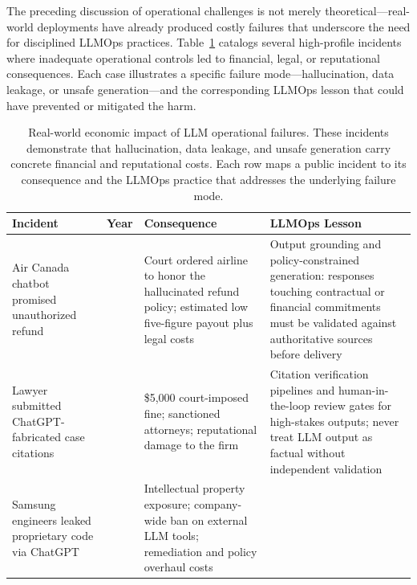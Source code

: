 The preceding discussion of operational challenges is not merely theoretical---real-world deployments have already produced costly failures that underscore the need for disciplined LLMOps practices. Table~\ref{tab:ch01_economic_impact} catalogs several high-profile incidents where inadequate operational controls led to financial, legal, or reputational consequences. Each case illustrates a specific failure mode---hallucination, data leakage, or unsafe generation---and the corresponding LLMOps lesson that could have prevented or mitigated the harm.

\begin{table}[t]
\centering
\small
\caption{Real-world economic impact of LLM operational failures. These incidents demonstrate that hallucination, data leakage, and unsafe generation carry concrete financial and reputational costs. Each row maps a public incident to its consequence and the LLMOps practice that addresses the underlying failure mode.}
\label{tab:ch01_economic_impact}
\setlength{\tabcolsep}{5pt}
\renewcommand{\arraystretch}{1.3}
\begin{tabularx}{\linewidth}{@{}>{\raggedright\arraybackslash}p{26mm}>{\raggedright\arraybackslash}p{14mm}>{\raggedright\arraybackslash}X>{\raggedright\arraybackslash}X@{}}
\toprule
\rowcolor{gray!15}
\textbf{Incident} & \textbf{Year} & \textbf{Consequence} & \textbf{LLMOps Lesson} \\
\midrule
Air Canada chatbot promised unauthorized refund\index{Air Canada chatbot} &
2024 &
Court ordered airline to honor the hallucinated refund policy; estimated low five-figure payout plus legal costs &
Output grounding\index{grounding} and policy-constrained generation: responses touching contractual or financial commitments must be validated against authoritative sources before delivery \\
\addlinespace[2pt]
Lawyer submitted ChatGPT-fabricated case citations\index{fabricated citations} &
2023 &
\$5{,}000 court-imposed fine; sanctioned attorneys; reputational damage to the firm &
Citation verification\index{citation!verification} pipelines and human-in-the-loop review gates for high-stakes outputs; never treat LLM output as factual without independent validation \\
\addlinespace[2pt]
Samsung engineers leaked proprietary code via ChatGPT\index{data leakage!Samsung} &
2023 &
Intellectual property exposure; company-wide ban on external LLM tools; remediation and policy overhaul costs &

\end{tabularx}
\end{table}
